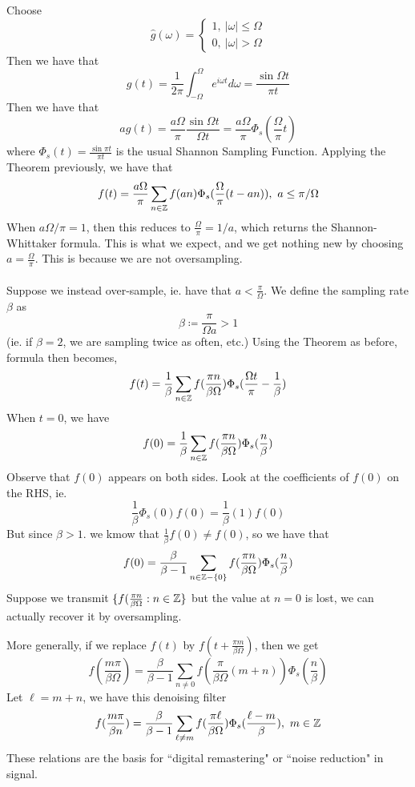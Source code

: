 \documentclass{article}
\begin{document}
\begin{example}
    Choose
    \[\widehat{g}(\omega) = \begin{cases}
        1,\ |\omega| \leq \Omega\\
        0,\ |\omega| > \Omega
    \end{cases}\]
    Then we have that
    \[g(t) = \frac{1}{2\pi} \int_{-\Omega}^\Omega e^{i\omega t} d\omega = \frac{\sin \Omega t}{\pi t}\]
    Then we have that
    \[a g(t) = \frac{a \Omega}{\pi} \frac{\sin \Omega t}{\Omega t} = \frac{a \Omega}{\pi} \Phi_s(\frac{\Omega}{\pi} t)\]
    where $\Phi_s(t) = \frac{\sin \pi t}{\pi t}$ is the usual Shannon Sampling Function. Applying the Theorem previously, we have that
    \[f(t) = \frac{a \Omega}{\pi} \sum_{n \in \mathbb{Z}} f(an) \Phi_s(\frac{\Omega}{\pi}(t - an)),\ a \leq \pi/\Omega\]
    When $a \Omega /\pi = 1$, then this reduces to $\frac{\Omega}{\pi} = 1/a$, which returns the Shannon-Whittaker formula. This is what we expect, and we get nothing new by choosing $a = \frac{\Omega}{\pi}$. This is because we are not oversampling.\\\\
    Suppose we instead over-sample, ie. have that $a < \frac{\pi}{\Omega}$. We define the sampling rate $\beta$ as
    \[\beta \coloneqq \frac{\pi}{\Omega a} > 1\]
    (ie. if $\beta = 2$, we are sampling twice as often, etc.) Using the Theorem as before, formula then becomes,
    \[f(t) = \frac{1}{\beta} \sum_{n \in \mathbb{Z}} f(\frac{\pi n}{\beta \Omega}) \Phi_s(\frac{\Omega t}{\pi} - \frac{1}{\beta})\]
    When $t = 0$, we have
    \[f(0) = \frac{1}{\beta} \sum_{n \in \mathbb{Z}} f(\frac{\pi n}{\beta \Omega}) \Phi_s(\frac{n}{\beta})\]
    Observe that $f(0)$ appears on both sides. Look at the coefficients of $f(0)$ on the RHS, ie.
    \[\frac{1}{\beta} \Phi_s(0) f(0) = \frac{1}{\beta}(1) f(0)\]
    But since $\beta > 1$. we kmow that $\frac{1}{\beta} f(0) \neq f(0)$, so we have that
    \[f(0) = \frac{\beta}{\beta - 1} \sum_{n \in \mathbb{Z} - \{0\}} f(\frac{\pi n}{\beta \Omega}) \Phi_s(\frac{n}{\beta})\]
    Suppose we transmit $\{f(\frac{\pi n}{\beta \Omega}: n \in \mathbb{Z}\}$ but the value at $n = 0$ is lost, we can actually recover it by oversampling.
\end{example}

More generally, if we replace $f(t)$ by $f(t + \frac{\pi m}{\beta \Omega})$, then we get
\[f(\frac{m \pi}{\beta \Omega}) = \frac{\beta}{\beta - 1} \sum_{n \neq 0} f(\frac{\pi}{\beta \Omega}(m + n)) \Phi_s(\frac{n}{\beta}) \]
Let $\ell = m + n$, we have this denoising filter
\[f(\frac{m \pi}{\beta n}) = \frac{\beta}{\beta - 1} \sum_{\ell \neq m} f(\frac{\pi \ell}{\beta \Omega}) \Phi_s(\frac{\ell - m}{\beta}),\ m \in \mathbb{Z}\]
These relations are the basis for ``digital remastering" or ``noise reduction" in signal.\\
\end{document}
